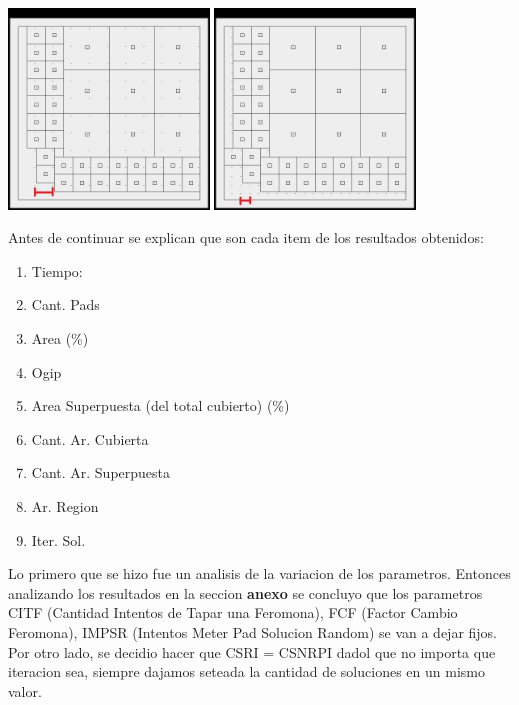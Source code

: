 \begin{enumerate}
\begin{center}
\includegraphics[width=0.4\textwidth]{imagenes/iter40}
\includegraphics[width=0.4\textwidth]{imagenes/iter45}
\end{center}

\end{enumerate}


Antes de continuar se explican que son cada item de los resultados obtenidos:

\begin{enumerate}
\item Tiempo: 
\item Cant. Pads
\item Area (\%)
\item Ogip
\item Area Superpuesta (del total cubierto) (\%)
\item Cant. Ar. Cubierta
\item Cant. Ar. Superpuesta
\item Ar. Region
\item Iter. Sol.

\end{enumerate}

				

Lo primero que se hizo fue un analisis de la variacion de los parametros. Entonces analizando los resultados en la seccion \textbf{anexo} se concluyo que los parametros CITF (Cantidad Intentos de Tapar una Feromona), FCF (Factor Cambio Feromona), IMPSR (Intentos Meter Pad Solucion Random) se van a dejar fijos. Por otro lado, se decidio hacer que CSRI = CSNRPI dadol que no importa que iteracion sea, siempre dajamos seteada la cantidad de soluciones en un mismo valor. 

